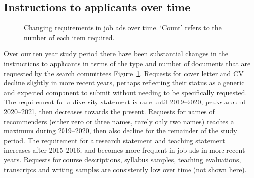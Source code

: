 \documentclass[
  12pt,
]{article}
\begin{document}
\subsection{Instructions to applicants over
time}\label{instructions-to-applicants-over-time}

\begin{figure}


\caption{\label{fig-requirements-over-time}Changing requirements in job
ads over time. `Count' refers to the number of each item required.}

\end{figure}%

Over our ten year study period there have been substantial changes in
the instructions to applicants in terms of the type and number of
documents that are requested by the search committees
Figure~\ref{fig-requirements-over-time}. Requests for cover letter and
CV decline slightly in more recent years, perhaps reflecting their
status as a generic and expected component to submit without needing to
be specifically requested. The requirement for a diversity statement is
rare until 2019--2020, peaks around 2020--2021, then decreases towards
the present. Requests for names of recommenders (either zero or three
names, rarely only two names) reaches a maximum during 2019--2020, then
also decline for the remainder of the study period. The requirement for
a research statement and teaching statement increases after 2015--2016,
and becomes more frequent in job ads in more recent years. Requests for
course descriptions, syllabus samples, teaching evaluations, transcripts
and writing samples are consistently low over time (not shown here).
\end{document}
